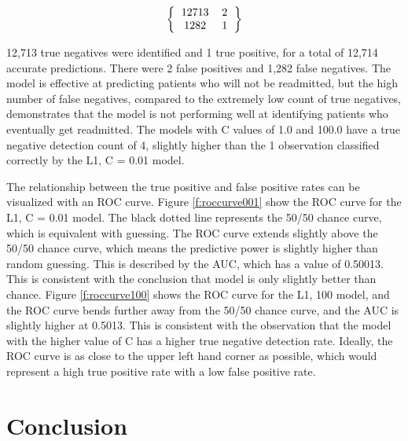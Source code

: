 \documentclass[sigconf]{acmart}
\begin{document}
\[ 
\left \{
  \begin{tabular}{ccc}
  12713 & 2 \\
  1282 & 1 
  \end{tabular}
\right \}
\]

12,713 true negatives were identified and 1 true positive, for a total of 12,714 accurate predictions. There were 2 false positives and 1,282 false negatives. The model is effective at predicting patients who will not be readmitted, but the high number of false negatives, compared to the extremely low count of true negatives, demonstrates that the model is not performing well at identifying patients who eventually get readmitted. The models with C values of 1.0 and 100.0 have a true negative detection count of 4, slightly higher than the 1 observation classified correctly by the L1, C = 0.01 model.

The relationship between the true positive and false positive rates can be visualized with an ROC curve. Figure \ref{f:roccurve001} show the ROC curve for the L1, C = 0.01 model. The black dotted line represents the 50/50 chance curve, which is equivalent with guessing. The ROC curve extends slightly above the 50/50 chance curve, which means the predictive power is slightly higher than random guessing. This is described by the AUC, which has a value of 0.50013. This is consistent with the conclusion that model is only slightly better than chance. Figure \ref{f:roccurve100} shows the ROC curve for the L1, 100 model, and the ROC curve bends further away from the 50/50 chance curve, and the AUC is slightly higher at 0.5013. This is consistent with the observation that the model with the higher value of C has a higher true negative detection rate. Ideally, the ROC curve is as close to the upper left hand corner as possible, which would represent a high true positive rate with a low false positive rate.

\section{Conclusion}
\end{document}
